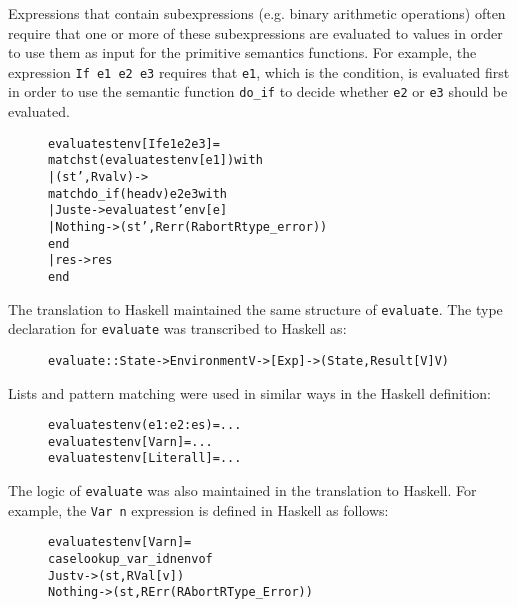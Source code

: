 \noindent Expressions that contain subexpressions (e.g. binary arithmetic
operations) often require that one or more of these subexpressions are
evaluated to values in order to use them as input for the primitive semantics
functions. For example, the expression \texttt{If e1 e2 e3} requires that
\texttt{e1}, which is the condition, is evaluated first in order to use the
semantic function \texttt{do\_if} to decide whether \texttt{e2} or
\texttt{e3} should be evaluated.

\begin{figure}[H]
\begin{alltt}
  evaluate st env [If e1 e2 e3] =
    match st (evaluate st env [e1]) with
    | (st', Rval v) ->
        match do_if (head v) e2 e3 with
        | Just e -> evaluate st' env [e]
        | Nothing -> (st', Rerr (Rabort Rtype_error))
        end
    | res -> res
    end
\end{alltt}
\end{figure}

The translation to Haskell maintained the same structure of \texttt{evaluate}.
The type declaration for \texttt{evaluate} was transcribed to Haskell as:
\begin{figure}[H]
\begin{alltt}
  evaluate :: State -> Environment V -> [Exp] -> (State, Result [V] V)
\end{alltt}
\end{figure}

\noindent Lists and pattern matching were used in similar ways in the Haskell definition:

\begin{figure}[H]
\begin{alltt}
  evaluate st env (e1:e2:es)  = ...
  evaluate st env [Var n]     = ...
  evaluate st env [Literal l] = ...
\end{alltt}
\end{figure}

\noindent The logic of \texttt{evaluate} was also maintained in the translation
to Haskell. For example, the \texttt{Var n} expression is defined in Haskell as
follows:

\begin{figure}[H]
\begin{alltt}
  evaluate st env [Var n] =
    case lookup_var_id n env of
      Just v  -> (st, RVal [v])
      Nothing -> (st, RErr (RAbort RType_Error))
\end{alltt}
\end{figure}

